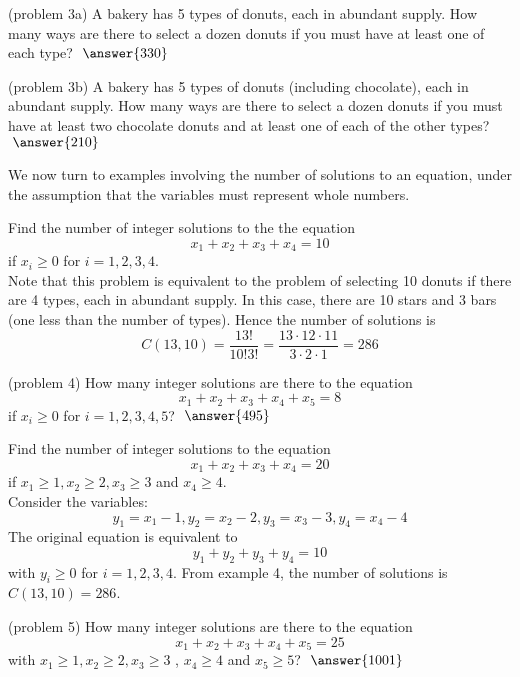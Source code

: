 \documentclass[handout]{ximera}
\begin{document}
\begin{problem}(problem 3a)
A bakery has 5 types of donuts, each in abundant supply. 
How many ways are there to select a dozen donuts if you must have at least 
one of each type? $\; \answer{330}$
\end{problem}

\begin{problem}(problem 3b)
A bakery has 5 types of donuts (including chocolate), each in abundant supply. 
How many ways are there to select a dozen donuts if you must have at least two 
chocolate donuts and at least one of each of the other types? $\; \answer{210}$
\end{problem}

We now turn to examples involving the number of solutions to an equation, under the assumption that 
the variables must represent whole numbers.

\begin{example}[example 4]
Find the number of integer solutions to the the equation
\[
x_1 + x_2 + x_3 + x_4 = 10
\]
if $x_i \geq 0$ for $i = 1, 2, 3, 4$.\\
Note that this problem is equivalent to the problem of selecting 10 donuts if 
there are 4 types, each in abundant supply. In this case, there are 10 stars 
and 3 bars (one less than the number of types).  Hence the number of solutions is 
\[
C(13, 10) = \frac{13!}{10! 3!} = \frac{13 \cdot 12 \cdot 11}{3 \cdot 2 \cdot 1} = 286
\]
\end{example}

\begin{problem}(problem 4)
How many integer solutions are there to the equation
\[
x_1 + x_2 + x_3 + x_4 +x_5 = 8
\]
if $x_i \geq 0$  for $i = 1, 2, 3, 4, 5$? $\; \answer{495}$
\end{problem}


\begin{example}[example 5]
Find the number of integer solutions to the equation
\[
x_1 + x_2 + x_3 + x_4 = 20
\]
if $x_1 \geq 1, x_2 \geq 2, x_3 \geq 3$ and $x_4 \geq 4$.\\
Consider the variables:
\[
y_1 = x_1 -1, y_2 = x_2 -2, y_3 = x_3 -3, y_4 = x_4 -4
\]
The original equation is equivalent to
\[
y_1 + y_2 + y_3 + y_4 = 10
\]
with $y_i \geq 0$ for $i = 1, 2, 3, 4$. From example 4, the number of solutions is $C(13,10) = 286$.
\end{example}


\begin{problem}(problem 5)
How many integer solutions are there to the equation
\[
x_1 + x_2 + x_3 + x_4 +x_5 = 25
\]
with $x_1 \geq 1, x_2 \geq 2, x_3 \geq 3$ , $x_4 \geq 4$ and $x_5 \geq 5$? $\; \answer{1001}$

\end{problem}
\end{document}
